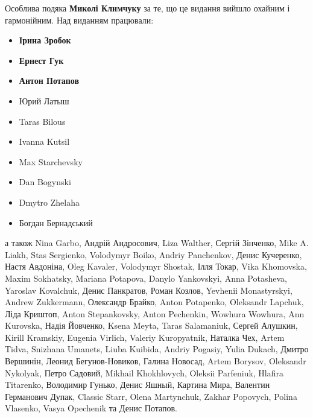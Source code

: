 

\noindent{}Особлива подяка \textbf{Миколі Климчуку} за те,
що це видання вийшло охайним і гармонійним. Над виданням працювали:
\begin{itemize}[nosep]
\item \textbf{Ірина Зробок}
\item \textbf{Ернест Гук}
\item \textbf{Антон Потапов}
\item Юрий Латыш
\item Taras Bilous
\item Ivanna Kutsil
\item Max Starchevsky
\item Dan Bogynski
\item Dmytro Zhelaha
\item Богдан Бернадський
\end{itemize}
\noindent{}а також Nina Garbo, Андрій Андросович, Liza Walther, Сергій Зінченко,
Mike A. Liakh, Stas Sergienko, Volodymyr Boiko, Andriy Panchenkov, Денис Кучеренко, Настя Авдоніна, Oleg Kavaler, Volodymyr Shostak, Ілля Токар, Vika Khomovska, Maxim Sokhatsky, Mariana Potapova, Danylo Yankovskyi, Anna Potasheva, Yaroslav Kovalchuk, Денис Панкратов, Роман Козлов, \textenglish{Yevhenii Mo\-nas\-tyr\-skyi}, Andrew Zukkermann, Олександр Брайко, Anton Potapenko, Oleksandr Lapchuk, Ліда Криштоп, Anton Stepankovsky, Anton Pechenkin, Wowhura Wowhura, Ann Kurovska, Надія Йовченко, Ksena Meyta, Taras Salamaniuk, Сергей Алушкин, Kirill Kramskiy, Eugenia Virlich, Valeriy Kuropyatnik, Наталка Чех, Artem Tidva, Snizhana Umanets, Liuba Kuibida, Andriy Pogasiy, Yulia Dukach, Дмитро Вершинін, Леонид Бегунов-Новиков, Галина Новосад, Artem Borysov, Oleksandr Nykolyak, Петро Садовий, Mikhail Khokhlovych, Oleksii Parfeniuk, Hlafira Titarenko, Володимир Гунько, Денис Яшный, Картина Мира, Валентин Германович Дупак, Classic Starr, Olena Martynchuk, Zakhar Popovych, Polina Vlasenko, Vasya Opechenik та Денис Потапов.

\cleardoublepage